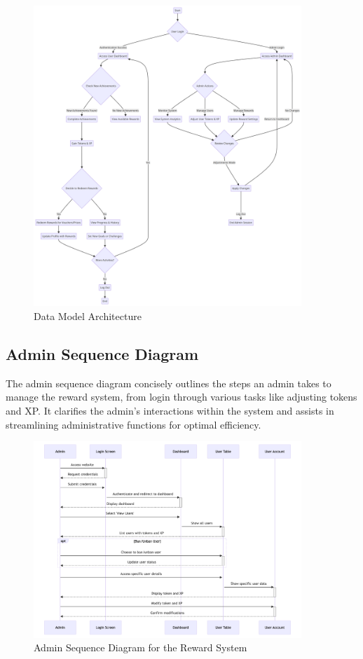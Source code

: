  \begin{figure}[H]
    \centering
    \includegraphics[width=0.9\textwidth]{src/assets/chapters/Reward-System_Activity-Flow.png}
    \caption{ Data Model Architecture}
    \label{fig:reward_system_architecture_overview}
\end{figure}

\subsection{Admin Sequence Diagram}
The admin sequence diagram concisely outlines the steps an admin takes to manage the reward system, from login through various tasks like adjusting tokens and XP. It clarifies the admin's interactions within the system and assists in streamlining administrative functions for optimal efficiency.


\begin{figure}[H]
    \centering
    \includegraphics[width=0.9\textwidth]{src/assets/chapters/AdminSequencediagram.png}
    \caption{Admin Sequence Diagram for the Reward System}
    \label{fig:admin_sequence_diagram}
\end{figure}
